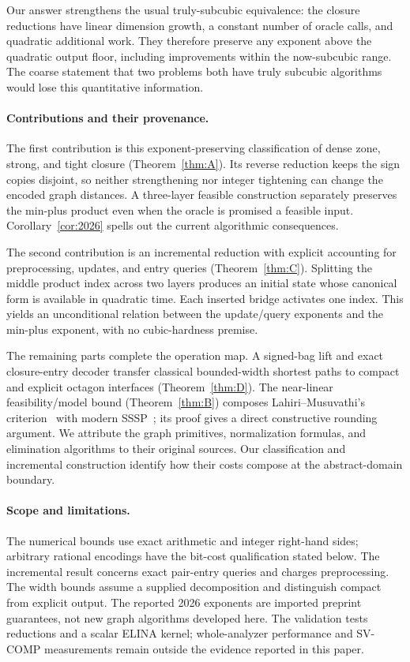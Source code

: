 \documentclass[manuscript,11pt,screen,nonacm]{acmart}
\theoremstyle{definition}
\begin{document}
Our answer strengthens the usual truly-subcubic equivalence: the closure reductions have linear dimension growth, a constant number of oracle calls, and quadratic additional work. They therefore preserve any exponent above the quadratic output floor, including improvements within the now-subcubic range. The coarse statement that two problems both have truly subcubic algorithms would lose this quantitative information.

\paragraph{Contributions and their provenance.}
The first contribution is this exponent-preserving classification of dense zone, strong, and tight closure (Theorem~\ref{thm:A}). Its reverse reduction keeps the sign copies disjoint, so neither strengthening nor integer tightening can change the encoded graph distances. A three-layer feasible construction separately preserves the min-plus product even when the oracle is promised a feasible input. Corollary~\ref{cor:2026} spells out the current algorithmic consequences.

The second contribution is an incremental reduction with explicit accounting for preprocessing, updates, and entry queries (Theorem~\ref{thm:C}). Splitting the middle product index across two layers produces an initial state whose canonical form is available in quadratic time. Each inserted bridge activates one index. This yields an unconditional relation between the update/query exponents and the min-plus exponent, with no cubic-hardness premise.

The remaining parts complete the operation map. A signed-bag lift and exact closure-entry decoder transfer classical bounded-width shortest paths to compact and explicit octagon interfaces (Theorem~\ref{thm:D}). The near-linear feasibility/model bound (Theorem~\ref{thm:B}) composes Lahiri--Musuvathi's criterion~\cite{lm2005} with modern SSSP~\cite{bnw2022}; its proof gives a direct constructive rounding argument. We attribute the graph primitives, normalization formulas, and elimination algorithms to their original sources. Our classification and incremental construction identify how their costs compose at the abstract-domain boundary.

\paragraph{Scope and limitations.}
The numerical bounds use exact arithmetic and integer right-hand sides; arbitrary rational encodings have the bit-cost qualification stated below. The incremental result concerns exact pair-entry queries and charges preprocessing. The width bounds assume a supplied decomposition and distinguish compact from explicit output. The reported 2026 exponents are imported preprint guarantees, not new graph algorithms developed here. The validation tests reductions and a scalar ELINA kernel; whole-analyzer performance and SV-COMP measurements remain outside the evidence reported in this paper.
\end{document}
